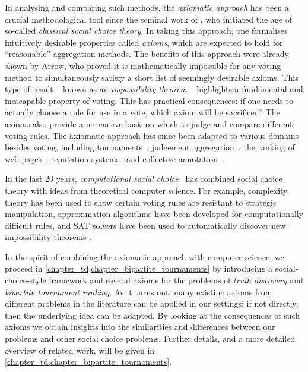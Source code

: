 In analysing and comparing such methods, the \emph{axiomatic approach} has been
a crucial methodological tool since the seminal work of \textcite{arrow1952},
who initiated the age of so-called \emph{classical social choice theory}. In
taking this approach, one formalises intuitively desirable properties called
\emph{axioms}, which are expected to hold for ``reasonable'' aggregation
methods. The benefits of this approach were already shown by Arrow, who proved
it is mathematically impossible for any voting method to simultaneously satisfy
a short list of seemingly desirable axioms. This type of result -- known as an
\emph{impossibility theorem} -- highlights a fundamental and inescapable
property of voting.\footnotemark{} This has practical consequences: if one
needs to actually choose a rule for use in a vote, which axiom will be
sacrificed? The axioms also provide a normative basis on which to judge and
compare different voting rules.
%
The axiomatic approach has since been adapted to various domains besides
voting, including tournaments~\cite{brandt2016a}, judgement
aggregation~\cite{endriss2016ja}, the ranking of web
pages~\cite{altman2005ranking}, reputation systems~\cite{tennenholtz2004} and
collective annotation~\cite{kruger2014}.



In the last 20 years, \emph{computational social choice}~\cite{moulin_2016} has
combined social choice theory with ideas from theoretical computer science. For
example, complexity theory has been used to show certain voting rules are
resistant to strategic manipulation, approximation algorithms have been
developed for computationally difficult rules, and SAT solvers have been used
to automatically discover new impossibility theorems .

In the spirit of combining the axiomatic approach with computer science, we
proceed in \cref{chapter_td,chapter_bipartite_tournaments} by introducing a
social-choice-style framework and several axioms for the problems of
\emph{truth discovery} and \emph{bipartite tournament ranking}. As it turns
out, many existing axioms from different problems in the literature can be
applied in our settings; if not directly, then the underlying idea can be
adapted. By looking at the consequences of such axioms we obtain insights into
the similarities and differences between our problems and other social choice
problems. Further details, and a more detailed overview of related work, will
be given in \cref{chapter_td,chapter_bipartite_tournaments}.


